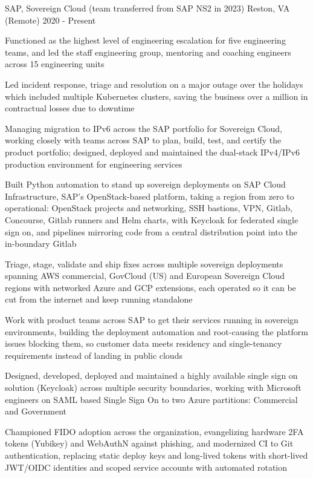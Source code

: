\documentclass{resume}
\begin{document}
            {SAP, Sovereign Cloud (team transferred from SAP NS2 in 2023)}
            {Reston, VA (Remote)}
            {2020 - Present}
\begin{resumeItems}
\item Functioned as the highest level of engineering escalation for five engineering teams, and led the staff engineering group, mentoring and coaching engineers across 15 engineering units
\item Led incident response, triage and resolution on a major outage over the holidays which included multiple Kubernetes clusters, saving the business over a million in contractual losses due to downtime
\item Managing migration to IPv6 across the SAP portfolio for Sovereign Cloud, working closely with teams across SAP to plan, build, test, and certify the product portfolio; designed, deployed and maintained the dual-stack IPv4/IPv6 production environment for engineering services
\item Built Python automation to stand up sovereign deployments on SAP Cloud Infrastructure, SAP's OpenStack-based platform, taking a region from zero to operational: OpenStack projects and networking, SSH bastions, VPN, Gitlab, Concourse, Gitlab runners and Helm charts, with Keycloak for federated single sign on, and pipelines mirroring code from a central distribution point into the in-boundary Gitlab
\item Triage, stage, validate and ship fixes across multiple sovereign deployments spanning AWS commercial, GovCloud (US) and European Sovereign Cloud regions with networked Azure and GCP extensions, each operated so it can be cut from the internet and keep running standalone
\item Work with product teams across SAP to get their services running in sovereign environments, building the deployment automation and root-causing the platform issues blocking them, so customer data meets residency and single-tenancy requirements instead of landing in public clouds
\item Designed, developed, deployed and maintained a highly available single sign on solution (Keycloak) across multiple security boundaries, working with Microsoft engineers on SAML based Single Sign On to two Azure partitions: Commercial and Government
\item Championed FIDO adoption across the organization, evangelizing hardware 2FA tokens (Yubikey) and WebAuthN against phishing, and modernized CI to Git authentication, replacing static deploy keys and long-lived tokens with short-lived JWT/OIDC identities and scoped service accounts with automated rotation

\end{resumeItems}
\end{document}
